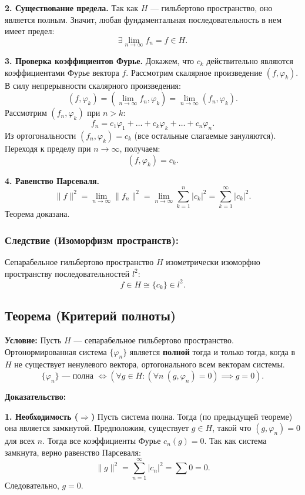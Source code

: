 \documentclass[12pt,a4paper,openany]{book}
\begin{document}
\textbf{2. Существование предела.}
Так как $H$ — гильбертово пространство, оно является полным. Значит, любая фундаментальная последовательность в нем имеет предел:
\[
\exists \lim_{n \to \infty} f_n = f \in H.
\]

\textbf{3. Проверка коэффициентов Фурье.}
Докажем, что $c_k$ действительно являются коэффициентами Фурье вектора $f$. Рассмотрим скалярное произведение $(f, \varphi_k)$. В силу непрерывности скалярного произведения:
\[
(f, \varphi_k) = (\lim_{n \to \infty} f_n, \varphi_k) = \lim_{n \to \infty} (f_n, \varphi_k).
\]
Рассмотрим $(f_n, \varphi_k)$ при $n > k$:
\[
f_n = c_1 \varphi_1 + \dots + c_k \varphi_k + \dots + c_n \varphi_n.
\]
Из ортогональности $(f_n, \varphi_k) = c_k$ (все остальные слагаемые зануляются).
Переходя к пределу при $n \to \infty$, получаем:
\[
(f, \varphi_k) = c_k.
\]

\textbf{4. Равенство Парсеваля.}
\[
\|f\|^2 = \lim_{n \to \infty} \|f_n\|^2 = \lim_{n \to \infty} \sum_{k=1}^n |c_k|^2 = \sum_{k=1}^\infty |c_k|^2.
\]
Теорема доказана.

\subsubsection{Следствие (Изоморфизм пространств):}
Сепарабельное гильбертово пространство $H$ изометрически изоморфно пространству последовательностей $l^2$:
\[
f \in H \cong \{c_k\} \in l^2.
\]

\subsection{Теорема (Критерий полноты)}

\textbf{Условие:}
Пусть $H$ — сепарабельное гильбертово пространство. Ортонормированная система $\{\varphi_n\}$ является \textbf{полной} тогда и только тогда, когда в $H$ не существует ненулевого вектора, ортогонального всем векторам системы.
\[
\{\varphi_n\} \text{ — полна } \iff \left( \forall g \in H: (\forall n \ (g, \varphi_n) = 0) \implies g = 0 \right).
\]

\textbf{Доказательство:}

\textbf{1. Необходимость ($\Rightarrow$)}
Пусть система полна. Тогда (по предыдущей теореме) она является замкнутой.
Предположим, существует $g \in H$, такой что $(g, \varphi_n) = 0$ для всех $n$.
Тогда все коэффициенты Фурье $c_n(g) = 0$.
Так как система замкнута, верно равенство Парсеваля:
\[
\|g\|^2 = \sum_{n=1}^\infty |c_n|^2 = \sum 0 = 0.
\]
Следовательно, $g = 0$.
\end{document}
